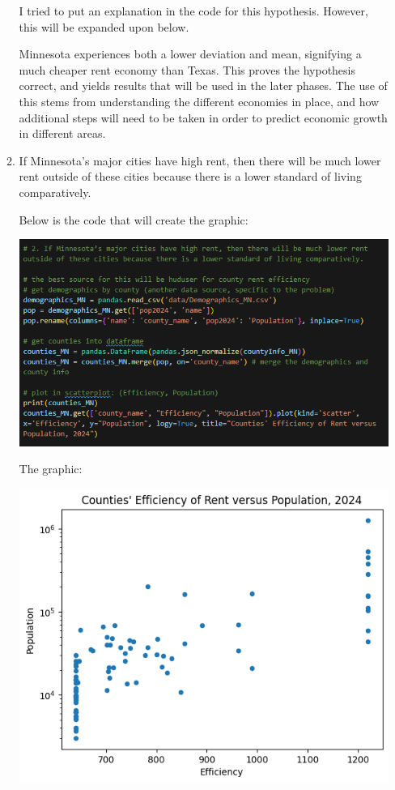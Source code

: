 \documentclass[a4paper]{article}
\begin{document}
\begin{enumerate}
\begin{enumerate}
    I tried to put an explanation in the code for this hypothesis. However, this will be expanded upon below. 
    
    Minnesota experiences both a lower deviation and mean, signifying a much cheaper rent economy than Texas. This proves the hypothesis correct, and yields results that will be used in the later phases. The use of this stems from understanding the different economies in place, and how additional steps will need to be taken in order to predict economic growth in different areas. 


    \item If Minnesota's major cities have high rent, then there will be much lower rent outside of these cities because there is a lower standard of living comparatively. 
    
    Below is the code that will create the graphic: 

    \includegraphics[scale=0.75]{Marcus-Hypothesis-2-code.png}

    The graphic:

    \includegraphics[scale=0.9]{Marcus-Hypothesis-2.png}


\end{enumerate}
\end{enumerate}
\end{document}
